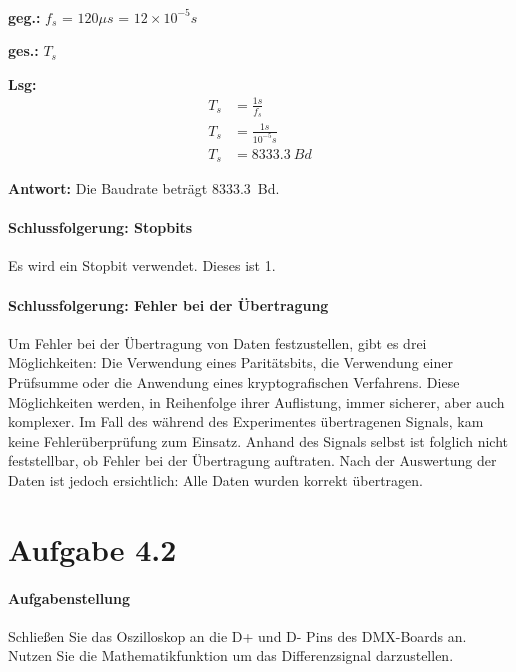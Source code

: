 \mbox{}\\
\noindent
\begin{minipage}{0.5\textwidth}
	\textbf{geg.:} $f_s$ = $120 \mu s$ = $12 \times 10^{-5} s$
\end{minipage}%
\begin{minipage}{0.5\textwidth}
	\textbf{ges.:} $T_s$
\end{minipage}

\vspace{0.25cm}

\noindent
\textbf{Lsg:}
\begin{align*}
	T_s &= \frac{1s}{f_s} \\
	T_s &= \frac{1s}{10^{-5}s} \\
	T_s &= \SI{8333,3}{Bd}
\end{align*}

\vspace{0.25cm}

\textbf{Antwort:} Die Baudrate beträgt \SI{8333,3}{Bd}.

\paragraph{Schlussfolgerung: Stopbits}
Es wird ein Stopbit verwendet. Dieses ist 1.

\paragraph{Schlussfolgerung: Fehler bei der Übertragung}
Um Fehler bei der Übertragung von Daten festzustellen, gibt es drei Möglichkeiten: Die Verwendung eines Paritätsbits, die Verwendung einer Prüfsumme oder die Anwendung eines kryptografischen Verfahrens. Diese Möglichkeiten werden, in Reihenfolge ihrer Auflistung, immer sicherer, aber auch komplexer. Im Fall des während des Experimentes übertragenen Signals, kam keine Fehlerüberprüfung zum Einsatz. Anhand des Signals selbst ist folglich nicht feststellbar, ob Fehler bei der Übertragung auftraten. Nach der Auswertung der Daten ist jedoch ersichtlich: Alle Daten wurden korrekt übertragen.

\section{Aufgabe 4.2}
\paragraph{Aufgabenstellung}
Schließen Sie das Oszilloskop an die D+ und D- Pins des DMX-Boards an. Nutzen Sie die Mathematikfunktion um das Differenzsignal darzustellen.

